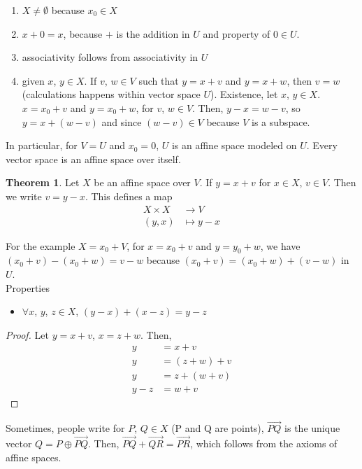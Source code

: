 \documentclass[letterpaper,12pt]{article}
\theoremstyle{definition}
\newtheorem*{theorem}{Theorem}
\renewcommand{\vec}[1]{\overrightarrow{#1}} %
\begin{document}
\begin{enumerate}
    \item $X \neq \emptyset$ because $x_0 \in X$
    \item $x + 0 = x$, because $+$ is the addition in $U$ and property of $0 \in U$.
    \item associativity follows from associativity in $U$
    \item given $x$, $y \in X$. If $v$, $w \in V$ such that $y = x + v$ and $y = x + w$, then $v = w$ (calculations happens within vector space $U$). Existence, let $x$, $y \in X$. $x = x_0 + v$ and $y = x_0 + w$, for $v$, $w \in V$. Then, $y - x = w - v$, so $y = x + (w - v)$ and since $(w - v) \in V$ because $V$ is a subspace.
\end{enumerate}
In particular, for $V = U$ and $x_0 = 0$, $U$ is an affine space modeled on $U$. Every vector space is an affine space over itself.


\begin{theorem}
Let $X$ be an affine space over $V$. If $y = x + v$ for $x \in X$, $v \in V$. Then we write $v = y - x$. This defines a map
\begin{align*}
    X \times X & \longrightarrow V \\
    (y,x) & \longmapsto y - x
\end{align*}
\end{theorem}
For the example $X = x_0 + V$, for $x = x_0 + v$ and $y = y_0 + w$, we have $(x_0 + v) - (x_0 + w) = v - w$ because $(x_0 + v) = (x_0 + w) + (v - w)$ in $U$.
\\ Properties
\begin{itemize}
    \item $\forall x$, $y$, $z \in X$, $(y - x) + (x - z) = y - z$
\end{itemize}
\begin{proof}
Let $y = x + v$, $x = z + w$. Then,
\begin{align*}
    y & = x + v \\
    y & = (z + w) + v \\
    y & = z + (w + v) \\
    y - z & = w + v
\end{align*}
\end{proof}

Sometimes, people write for $P$, $Q \in X$ (P and Q are points), $\vec{PQ}$ is the unique vector $Q = P \oplus \vec{PQ}$. Then, $\vec{PQ} + \vec{QR} = \vec{PR}$, which follows from the axioms of affine spaces.
\end{document}

